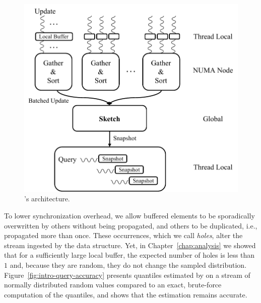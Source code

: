 \begin{figure}[htp]
    \centering
        \includegraphics[width=0.8\linewidth,trim={0cm 0cm 0cm 0.3cm},clip]{graphics/algorithm/Quancurrent_structure_intro.pdf}
    \caption{\mysketch's architecture.}
    \label{fig:quancurrentDS}
\end{figure}


To lower synchronization overhead, we allow buffered elements to be sporadically overwritten by others without being propagated, and others to be duplicated, i.e., propagated more than once. These occurrences, which we call \emph{holes}, alter the stream ingested by the data structure. 
Yet, in Chapter~\ref{chap:analysis} we showed that for a sufficiently large local buffer, the expected number of holes is less than $1$ and, because they are random, they do not change the sampled distribution.
Figure~\ref{fig:intro-query-accuracy} presents quantiles estimated by \mysketch on a stream of normally distributed random values compared to an exact, brute-force computation of the quantiles, and shows that the estimation remains accurate.

